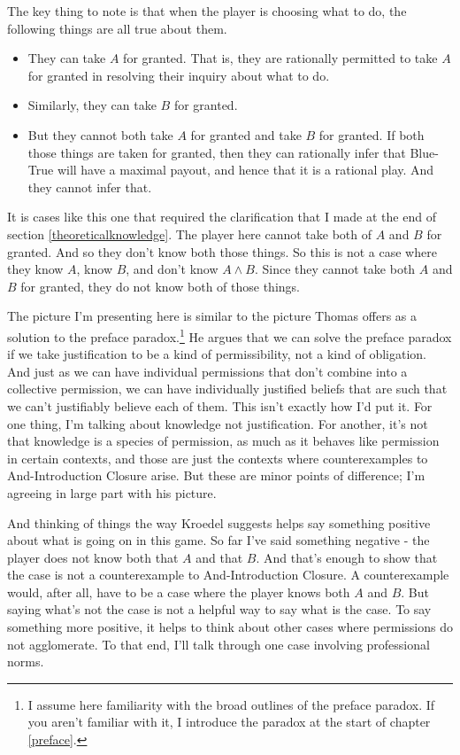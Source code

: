 \documentclass[11pt,]{book}
\providecommand{\tightlist}{%
  \setlength{\itemsep}{0pt}\setlength{\parskip}{0pt}}
\let\rmarkdownfootnote\footnote%
\def\footnote{\protect\rmarkdownfootnote}
\begin{document}
The key thing to note is that when the player is choosing what to do, the following things are all true about them.

\begin{itemize}
\tightlist
\item
  They can take \(A\) for granted. That is, they are rationally permitted to take \(A\) for granted in resolving their inquiry about what to do.
\item
  Similarly, they can take \(B\) for granted.
\item
  But they cannot both take \(A\) for granted and take \(B\) for granted. If both those things are taken for granted, then they can rationally infer that Blue-True will have a maximal payout, and hence that it is a rational play. And they cannot infer that.
\end{itemize}

It is cases like this one that required the clarification that I made at the end of section \ref{theoreticalknowledge}. The player here cannot take both of \(A\) and \(B\) for granted. And so they don't know both those things. So this is not a case where they know \(A\), know \(B\), and don't know \(A \wedge B\). Since they cannot take both \(A\) and \(B\) for granted, they do not know both of those things.

The picture I'm presenting here is similar to the picture Thomas \citet{Kroedel2012} offers as a solution to the preface paradox.\footnote{I assume here familiarity with the broad outlines of the preface paradox. If you aren't familiar with it, I introduce the paradox at the start of chapter \ref{preface}.} He argues that we can solve the preface paradox if we take justification to be a kind of permissibility, not a kind of obligation. And just as we can have individual permissions that don't combine into a collective permission, we can have individually justified beliefs that are such that we can't justifiably believe each of them. This isn't exactly how I'd put it. For one thing, I'm talking about knowledge not justification. For another, it's not that knowledge is a species of permission, as much as it behaves like permission in certain contexts, and those are just the contexts where counterexamples to And-Introduction Closure arise. But these are minor points of difference; I'm agreeing in large part with his picture.

And thinking of things the way Kroedel suggests helps say something positive about what is going on in this game. So far I've said something negative - the player does not know both that \(A\) and that \(B\). And that's enough to show that the case is not a counterexample to And-Introduction Closure. A counterexample would, after all, have to be a case where the player knows both \(A\) and \(B\). But saying what's not the case is not a helpful way to say what is the case. To say something more positive, it helps to think about other cases where permissions do not agglomerate. To that end, I'll talk through one case involving professional norms.
\end{document}
